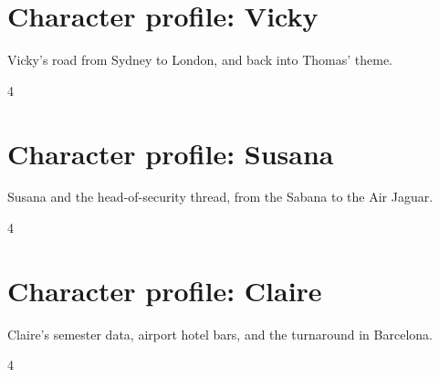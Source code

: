 \documentclass[a4paper,landscape]{memoir}
\begin{document}
\chapter{Character profile: Vicky}
Vicky's road from Sydney to London, and back into Thomas' theme.
\clearpage\begin{multicols*}{4}



\end{multicols*}

\chapter{Character profile: Susana}
Susana and the head-of-security thread, from the Sabana to the Air Jaguar.
\clearpage\begin{multicols*}{4}








\end{multicols*}

\chapter{Character profile: Claire}
Claire's semester data, airport hotel bars, and the turnaround in Barcelona.
\clearpage\begin{multicols*}{4}







\end{multicols*}
\end{document}
